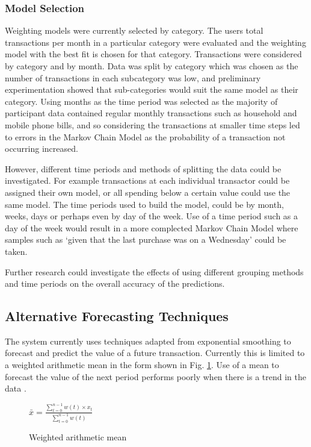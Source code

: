 \subsubsection{Model Selection}
\label{section:overfittingmodels}
Weighting models were currently selected by category. The users total transactions per month in a particular category were evaluated and the weighting model with the best fit is chosen for that category. Transactions were considered by category and by month. Data was split by category which was chosen as the number of transactions in each subcategory was low, and preliminary experimentation showed that  sub-categories would suit the same model as their category. Using months as the time period was selected as the majority of participant data contained regular monthly transactions such as household and mobile phone bills, and so considering the transactions at smaller time steps led to errors in the Markov Chain Model as the probability of a transaction not occurring increased.

However, different time periods and methods of splitting the data could be investigated. For example transactions at each individual transactor could be assigned their own model, or all spending below a certain value could use the same model. The time periods used to build the model, could be by month, weeks, days or perhaps even by day of the week. Use of a time period such as a day of the week would result in a more complected Markov Chain Model where samples such as `given that the last purchase was on a Wednesday' could be taken.

Further research could investigate the effects of using different grouping methods and time periods on the overall accuracy of the predictions.

\subsection{Alternative Forecasting Techniques}
\label{section:triplesmoothing}
The system currently uses techniques adapted from exponential smoothing to forecast and predict the value of a future transaction. Currently this is limited to a weighted arithmetic mean in the form shown in Fig. \ref{fig:weighted-mean}. Use of a mean to forecast the value of the next period performs poorly when there is a trend in the data \parencite{filliben2003nist}.

\begin{figure}
\centering
$\bar{x} = \frac{\sum^{n-1}_{t=0}{w(t) \times x_{t}}}{\sum_{t=0}^{n-1}{w(t)}}$
\caption{Weighted arithmetic mean}
\label{fig:weighted-mean}
\end{figure}

